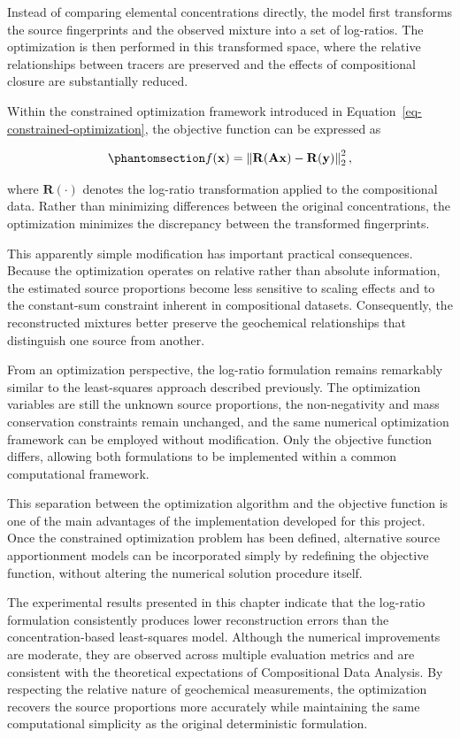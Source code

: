 \documentclass[
  12pt,
  letterpaper,
]{book}
\begin{document}
Instead of comparing elemental concentrations directly, the model first
transforms the source fingerprints and the observed mixture into a set
of log-ratios. The optimization is then performed in this transformed
space, where the relative relationships between tracers are preserved
and the effects of compositional closure are substantially reduced.

Within the constrained optimization framework introduced in
Equation~\ref{eq-constrained-optimization}, the objective function can
be expressed as

\begin{equation}\phantomsection\label{eq-sandoval-objective}{
f(\mathbf{x})
=
\left\|
\mathbf{R}(\mathbf{A}\mathbf{x})
-
\mathbf{R}(\mathbf{y})
\right\|_2^2,
}\end{equation}

where \(\mathbf{R}(\cdot)\) denotes the log-ratio transformation applied
to the compositional data. Rather than minimizing differences between
the original concentrations, the optimization minimizes the discrepancy
between the transformed fingerprints.

This apparently simple modification has important practical
consequences. Because the optimization operates on relative rather than
absolute information, the estimated source proportions become less
sensitive to scaling effects and to the constant-sum constraint inherent
in compositional datasets. Consequently, the reconstructed mixtures
better preserve the geochemical relationships that distinguish one
source from another.

From an optimization perspective, the log-ratio formulation remains
remarkably similar to the least-squares approach described previously.
The optimization variables are still the unknown source proportions, the
non-negativity and mass conservation constraints remain unchanged, and
the same numerical optimization framework can be employed without
modification. Only the objective function differs, allowing both
formulations to be implemented within a common computational framework.

This separation between the optimization algorithm and the objective
function is one of the main advantages of the implementation developed
for this project. Once the constrained optimization problem has been
defined, alternative source apportionment models can be incorporated
simply by redefining the objective function, without altering the
numerical solution procedure itself.

The experimental results presented in this chapter indicate that the
log-ratio formulation consistently produces lower reconstruction errors
than the concentration-based least-squares model. Although the numerical
improvements are moderate, they are observed across multiple evaluation
metrics and are consistent with the theoretical expectations of
Compositional Data Analysis. By respecting the relative nature of
geochemical measurements, the optimization recovers the source
proportions more accurately while maintaining the same computational
simplicity as the original deterministic formulation.
\end{document}
